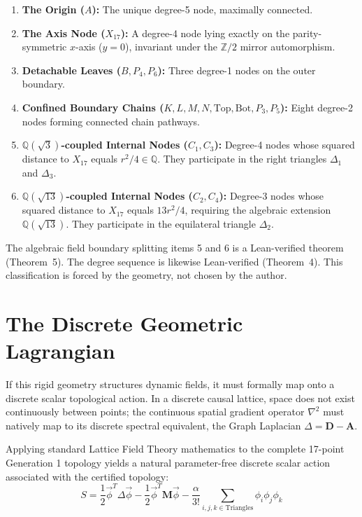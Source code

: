 \documentclass[12pt, a4paper]{article}
\begin{document}
\begin{enumerate}
    \item \textbf{The Origin ($A$):} The unique degree-5 node, maximally connected.
    \item \textbf{The Axis Node ($X_{17}$):} A degree-4 node lying exactly on the parity-symmetric $x$-axis ($y = 0$), invariant under the $\mathbb{Z}/2$ mirror automorphism.
    \item \textbf{Detachable Leaves ($B, P_4, P_6$):} Three degree-1 nodes on the outer boundary.
    \item \textbf{Confined Boundary Chains ($K, L, M, N, \text{Top}, \text{Bot}, P_3, P_5$):} Eight degree-2 nodes forming connected chain pathways.
    \item \textbf{$\mathbb{Q}(\sqrt{3})$-coupled Internal Nodes ($C_1, C_3$):} Degree-4 nodes whose squared distance to $X_{17}$ equals $r^2/4 \in \mathbb{Q}$. They participate in the right triangles $\Delta_1$ and $\Delta_3$.
    \item \textbf{$\mathbb{Q}(\sqrt{13})$-coupled Internal Nodes ($C_2, C_4$):} Degree-3 nodes whose squared distance to $X_{17}$ equals $13r^2/4$, requiring the algebraic extension $\mathbb{Q}(\sqrt{13})$. They participate in the equilateral triangle $\Delta_2$.
\end{enumerate}

The algebraic field boundary splitting items 5 and 6 is a Lean-verified theorem (Theorem~5). The degree sequence is likewise Lean-verified (Theorem~4). This classification is forced by the geometry, not chosen by the author.



\section{The Discrete Geometric Lagrangian}\label{sec:lagrangian}

If this rigid geometry structures dynamic fields, it must formally map onto a discrete scalar topological action. In a discrete causal lattice, space does not exist continuously between points; the continuous spatial gradient operator $\nabla^2$ must natively map to its discrete spectral equivalent, the Graph Laplacian $\Delta = \mathbf{D} - \mathbf{A}$.

Applying standard Lattice Field Theory mathematics to the complete 17-point Generation 1 topology yields a natural parameter-free discrete scalar action associated with the certified topology:
\begin{equation}
S = \frac{1}{2} \vec{\phi}^T \Delta \vec{\phi} - \frac{1}{2} \vec{\phi}^T \mathbf{M} \vec{\phi} - \frac{\alpha}{3!} \sum_{i,j,k \in \text{Triangles}} \phi_i \phi_j \phi_k
\end{equation}
\end{document}
